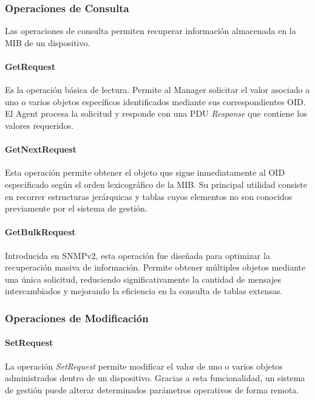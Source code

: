 \subsubsection{Operaciones de Consulta}

Las operaciones de consulta permiten recuperar información almacenada en la MIB de un dispositivo.

\paragraph{GetRequest}

Es la operación básica de lectura. Permite al Manager solicitar el valor asociado a uno o varios objetos específicos identificados mediante sus correspondientes OID. El Agent procesa la solicitud y responde con una PDU \textit{Response} que contiene los valores requeridos.

\paragraph{GetNextRequest}

Esta operación permite obtener el objeto que sigue inmediatamente al OID especificado según el orden lexicográfico de la MIB. Su principal utilidad consiste en recorrer estructuras jerárquicas y tablas cuyos elementos no son conocidos previamente por el sistema de gestión.

\paragraph{GetBulkRequest}

Introducida en SNMPv2, esta operación fue diseñada para optimizar la recuperación masiva de información. Permite obtener múltiples objetos mediante una única solicitud, reduciendo significativamente la cantidad de mensajes intercambiados y mejorando la eficiencia en la consulta de tablas extensas.

\subsubsection{Operaciones de Modificación}

\paragraph{SetRequest}

La operación \textit{SetRequest} permite modificar el valor de uno o varios objetos administrados dentro de un dispositivo. Gracias a esta funcionalidad, un sistema de gestión puede alterar determinados parámetros operativos de forma remota.

